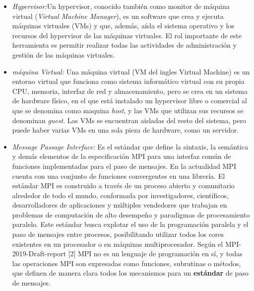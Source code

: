 \documentclass[letterpaper, 12pt, oneside]{article}
\begin{document}
    
    \begin{itemize}
         \item \textit{Hypervisor:}Un hypervisor, conocido también como monitor de máquina virtual (\textit{Virtual Machine Manager}), es un software que crea y ejecuta máquinas virtuales (VMs) y que, además, aísla el sistema operativo y los recursos del hypervisor de las máquinas virtuales. El rol importante de este herramienta es permitir realizar todas las actividades de administración y gestión de las máquinas virtuales.\cite{hypervisor}
        
        \item \textit{máquina Virtual:} Una máquina virtual (VM  del ingles Virtual Machine) es un entorno virtual que funciona como sistema informático virtual con su propia CPU, memoria, interfaz de red y almacenamiento, pero se crea en un sistema de hardware físico, en el que está instalado un hypervisor libre o comercial al que se denomina como maquina \textit{host}, y las VMs que utilizan sus recursos se denominan \textit{guest}.  Las VMs se encuentran aisladas del resto del sistema, pero puede haber varias VMs en una sola pieza de hardware, como un servidor.\cite{virtualmachine}
        
        \item \textit{Message Passage Interface:} Es el estándar que define la sintaxis, la semántica y demás elementos de la especificación MPI para  una interfaz común de funciones implementadas para el paso de mensajes. 
        En la actualidad MPI cuenta con una conjunto de funciones convergentes en una librería. El estándar MPI es construido a través de un proceso abierto y comunitario alrededor de todo el mundo, conformada por investigadores, científicos, desarrolladores de aplicaciones y múltiples vendedores que trabajan en problemas de computación de alto desempeño y paradigmas de procesamiento paralelo. Este estándar busca explotar el uso de la programación paralela y el paso de mensajes entre procesos, posibilitando utilizar todos los cores existentes en un procesador o en máquinas multiprocesador.
        Según el MPI-2019-Draft-report\cite{MpiDraf} [2] MPI no es un lenguaje de programación en sí, y todas las operaciones MPI son expresadas como funciones, subrutinas o métodos, que definen de manera clara todos los mecanismos para un \textbf{
        estándar} de paso de mensajes.  
        

\end{itemize}
\end{document}
